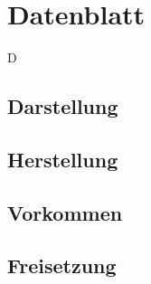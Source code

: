 \section{Datenblatt}
D
\subsection{Darstellung}
\subsection{Herstellung}
\subsection{Vorkommen}
\subsection{Freisetzung}
